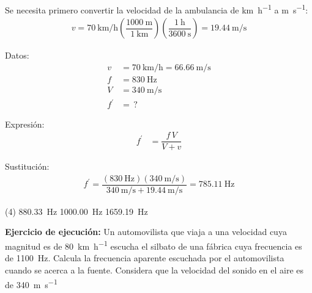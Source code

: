\documentclass[12pt, letter]{exam}
\begin{document}
\begin{questions}
    Se necesita primero convertir la velocidad de la ambulancia de \unit{\kilo\meter\per\hour} a \unit{\meter\per\second}:
    \begin{align*}
    v = \SI[per-mode=fraction]{70}{\kilo\meter\per\hour} \left( \dfrac{\SI{1000}{\meter}}{\SI{1}{\kilo\meter}} \right) \left( \dfrac{\SI{1}{\hour}}{\SI{3600}{\second}} \right) = \SI[per-mode=fraction]{19.44}{\meter\per\second}
    \end{align*}
    
    \begin{minipage}[t]{0.35\linewidth}
    Datos: 
    \begin{align*}
    v &= \SI{70}{\kilo\meter\per\hour} = \SI{66.66}{\meter\per\second} \\
    f &= \SI{830}{\hertz} \\
    V &= \SI{340}{\meter\per\second} \\
    f^{\prime} &= \, ?
    \end{align*}
    \end{minipage}
    \hspace{1cm}
    \begin{minipage}[t]{0.4\linewidth}
    Expresión:
    \begin{align*}
    f^{\prime} &= \dfrac{f \, V}{V + v}
    \end{align*}
    \end{minipage}

    Sustitución:
    \begin{align*}
    f^{\prime} = \dfrac{\left( \SI{830}{\hertz} \right)\left( \displaystyle \SI[per-mode=fraction]{340}{\meter\per\second} \right)}{\displaystyle \SI[per-mode=fraction]{340}{\meter\per\second} + \SI[per-mode=fraction]{19.44}{\meter\per\second}} = \SI{785.11}{\hertz}
    \end{align*}

   \begin{tasks}(4)
    \task {}
    \task \SI{880.33}{\hertz}
    \task \SI{1000.00}{\hertz}
    \task \SI{1659.19}{\hertz}
    \end{tasks}
      
    \setcounter{question}{11} \question \textbf{Ejercicio de ejecución: } Un automovilista que viaja a una velocidad cuya magnitud es de \SI{80}{\kilo\meter\per\hour} escucha el silbato de una fábrica cuya frecuencia es de \SI{1100}{\hertz}. Calcula la frecuencia aparente escuchada por el automovilista cuando se acerca a la fuente. Considera que la velocidad del sonido en el aire es de \SI{340}{\meter\per\second}


\end{questions}
\end{document}

